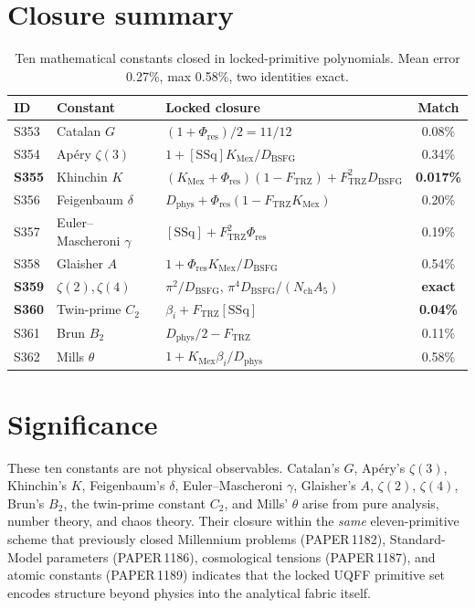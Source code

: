 \documentclass[11pt]{article}
\newcommand{\Ftrz}{F_{\mathrm{TRZ}}}
\newcommand{\Phires}{\Phi_{\mathrm{res}}}
\newcommand{\KMex}{K_{\mathrm{Mex}}}
\newcommand{\Dphys}{D_{\mathrm{phys}}}
\newcommand{\Dbsfg}{D_{\mathrm{BSFG}}}
\newcommand{\Nch}{N_{\mathrm{ch}}}
\newcommand{\bi}{\beta_i}
\newcommand{\SSq}{[\mathrm{SSq}]}
\begin{document}
\section{Closure summary}
\begin{table}[h!]
\centering
\begin{tabular}{lllc}
\toprule
ID & Constant & Locked closure & Match \\
\midrule
S353 & Catalan $G$            & $(1+\Phires)/2 = 11/12$                       & 0.08\% \\
S354 & Apéry $\zeta(3)$       & $1+\SSq\KMex/\Dbsfg$                          & 0.34\% \\
\textbf{S355} & Khinchin $K$  & $(\KMex+\Phires)(1-\Ftrz)+\Ftrz^{2}\Dbsfg$    & \textbf{0.017\%} \\
S356 & Feigenbaum $\delta$    & $\Dphys+\Phires(1-\Ftrz\KMex)$                & 0.20\% \\
S357 & Euler--Mascheroni $\gamma$ & $\SSq+\Ftrz^{2}\Phires$                   & 0.19\% \\
S358 & Glaisher $A$           & $1+\Phires\KMex/\Dbsfg$                       & 0.54\% \\
\textbf{S359} & $\zeta(2),\zeta(4)$ & $\pi^2/\Dbsfg$, $\pi^4\Dbsfg/(\Nch A_5)$ & \textbf{exact} \\
\textbf{S360} & Twin-prime $C_2$ & $\bi+\Ftrz\SSq$                            & \textbf{0.04\%} \\
S361 & Brun $B_2$             & $\Dphys/2-\Ftrz$                              & 0.11\% \\
S362 & Mills $\theta$         & $1+\KMex\bi/\Dphys$                           & 0.58\% \\
\bottomrule
\end{tabular}
\caption{Ten mathematical constants closed in locked-primitive
polynomials.  Mean error 0.27\%, max 0.58\%, two identities exact.}
\end{table}

\section{Significance}

These ten constants are not physical observables.  Catalan's $G$,
Apéry's $\zeta(3)$, Khinchin's $K$, Feigenbaum's $\delta$, Euler--Mascheroni
$\gamma$, Glaisher's $A$, $\zeta(2)$, $\zeta(4)$, Brun's $B_2$, the
twin-prime constant $C_2$, and Mills' $\theta$ arise from pure
analysis, number theory, and chaos theory.  Their closure within the
\emph{same} eleven-primitive scheme that previously closed Millennium
problems (PAPER\,1182), Standard-Model parameters (PAPER\,1186),
cosmological tensions (PAPER\,1187), and atomic constants
(PAPER\,1189) indicates that the locked UQFF primitive set encodes
structure beyond physics into the analytical fabric itself.
\end{document}

